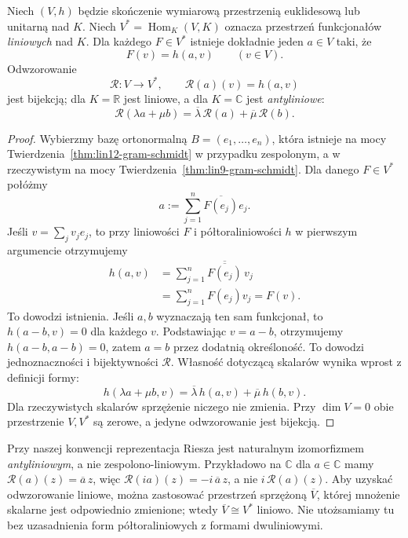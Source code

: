 \begin{twierdzenie}
\label{thm:lin12-riesz}
Niech \((V,h)\) będzie skończenie
wymiarową przestrzenią euklidesową
lub unitarną nad \(K\).
Niech \(V^*=\operatorname{Hom}_K(V,K)\)
oznacza przestrzeń funkcjonałów
\emph{liniowych} nad \(K\).
Dla każdego \(F\in V^*\)
istnieje dokładnie jeden \(a\in V\)
taki, że
\[
 F(v)=h(a,v)\qquad(v\in V).
\]
Odwzorowanie
\[
 \mathcal R\colon V\longrightarrow V^*,
 \qquad
 \mathcal R(a)(v)=h(a,v)
\]
jest bijekcją; dla \(K=\mathbb R\)
jest liniowe, a dla \(K=\mathbb C\)
jest \emph{antyliniowe}:
\[
 \mathcal R(\lambda a+\mu b)
 =\overline\lambda\,\mathcal R(a)+
  \overline\mu\,\mathcal R(b).
\]
\end{twierdzenie}
\begin{proof}
Wybierzmy bazę ortonormalną
\(B=(e_1,\ldots,e_n)\),
która istnieje na mocy
Twierdzenia~\ref{thm:lin12-gram-schmidt}
w przypadku zespolonym,
a w rzeczywistym na mocy
Twierdzenia~\ref{thm:lin9-gram-schmidt}.
Dla danego \(F\in V^*\)
połóżmy
\[
 a:=\sum_{j=1}^n
       \overline{F(e_j)}e_j.
\]
Jeśli \(v=\sum_jv_je_j\),
to przy liniowości \(F\)
i półtoraliniowości \(h\)
w pierwszym argumencie
otrzymujemy
\[
 \begin{aligned}
 h(a,v)
 &=\sum_{j=1}^n
   \overline{\overline{F(e_j)}}\,v_j\\
 &=\sum_{j=1}^n F(e_j)v_j=F(v).
 \end{aligned}
\]
To dowodzi istnienia.
Jeśli \(a,b\) wyznaczają
ten sam funkcjonał, to
\(h(a-b,v)=0\) dla każdego \(v\).
Podstawiając \(v=a-b\),
otrzymujemy
\(h(a-b,a-b)=0\), zatem
\(a=b\) przez dodatnią określoność.
To dowodzi jednoznaczności
i bijektywności \(\mathcal R\).
Własność dotyczącą skalarów
wynika wprost z definicji formy:
\[
 h(\lambda a+\mu b,v)
 =\overline\lambda\,h(a,v)+
  \overline\mu\,h(b,v).
\]
Dla rzeczywistych skalarów
sprzężenie niczego nie zmienia.
Przy \(\dim V=0\) obie
przestrzenie \(V,V^*\) są zerowe,
a jedyne odwzorowanie jest bijekcją.
\end{proof}

\begin{uwaga}
\label{rem:lin12-riesz-anty}
Przy naszej konwencji reprezentacja
Riesza jest naturalnym izomorfizmem
\emph{antyliniowym}, a nie
zespolono-liniowym.
Przykładowo na \(\mathbb C\)
dla \(a\in\mathbb C\) mamy
\(\mathcal R(a)(z)=\overline a\,z\),
więc
\(\mathcal R(ia)(z)=-i\,\overline a\,z\),
a nie \(i\,\mathcal R(a)(z)\).
Aby uzyskać odwzorowanie liniowe,
można zastosować przestrzeń sprzężoną
\(\overline V\), której mnożenie
skalarne jest odpowiednio zmienione;
wtedy \(\overline V\cong V^*\)
liniowo. Nie utożsamiamy tu bez
uzasadnienia form półtoraliniowych
z formami dwuliniowymi.
\end{uwaga}

